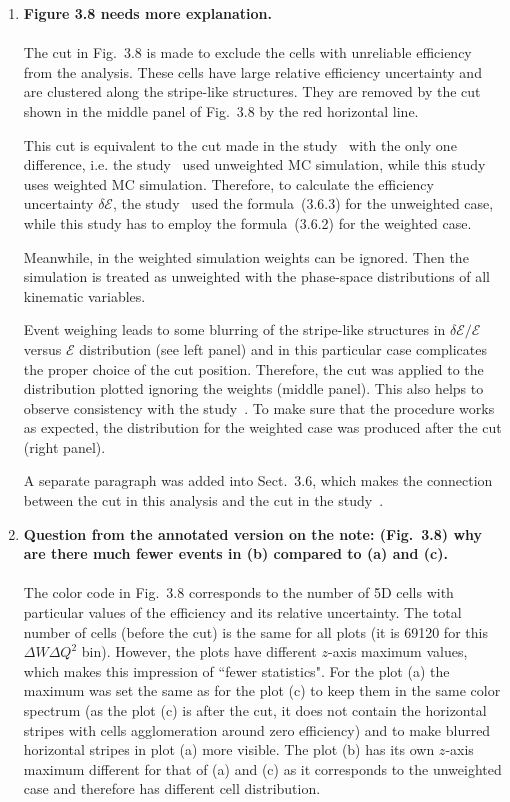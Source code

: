 \documentclass[,superscriptaddress,showpacs,amssymb,amsmath,amsfonts,linenumbers,article]{revtex4-1}
\begin{document}
\begin{enumerate}[label=\textbf{\arabic*}.]
\item {\bf Figure 3.8 needs more explanation.}\\ \\
The cut in Fig.~3.8 is made to exclude the cells with unreliable efficiency from the analysis. These cells have large relative efficiency uncertainty and are clustered along the stripe-like structures. They are removed by the cut shown in the middle panel of Fig.~3.8 by the red horizontal line.

This cut is equivalent to the cut made in the study~\cite{fedotov_prc} with the only one difference, i.e. the study~\cite{fedotov_prc} used unweighted MC simulation, while this study uses weighted MC simulation. Therefore, to calculate the efficiency uncertainty $\delta \mathcal{E}$, the study~\cite{fedotov_prc} used the formula~(3.6.3) for the unweighted case, while this study has to employ the formula~(3.6.2) for the weighted case. 

Meanwhile, in the weighted simulation weights can be ignored. Then the simulation is treated as unweighted with the phase-space distributions of all kinematic variables.


Event weighing leads to some blurring of the stripe-like structures in $\delta \mathcal{E} / \mathcal{E}$ versus $\mathcal{E}$ distribution (see left panel) and in this particular case complicates the proper choice of the cut position. Therefore, the cut was applied to the distribution plotted ignoring the weights (middle panel). This also helps to observe consistency with the study~\cite{fedotov_prc}. To make sure that the procedure works as expected, the distribution for the weighted case was produced after the cut (right panel).

A separate paragraph was added into Sect.~3.6, which makes the connection between the cut in this analysis and the cut in the study~\cite{fedotov_prc}.


\item {\bf Question from the annotated version on the note: (Fig.~3.8) why are there much fewer events in (b) compared to (a) and (c). }\\ \\
The color code in Fig.~3.8 corresponds to the number of 5D cells with particular values of the efficiency and its relative uncertainty. The total number of cells (before the cut) is the same for all plots (it is 69120 for this $\Delta W \Delta Q^{2}$ bin). However, the plots have different $z$-axis maximum values, which makes this impression of ``fewer statistics". For the plot (a) the maximum was set the same as for the plot (c) to keep them in the same color spectrum (as the plot (c) is after the cut, it does not contain the horizontal stripes with cells agglomeration around zero efficiency) and to make blurred horizontal stripes in plot (a) more visible.  The plot (b) has its own $z$-axis maximum different for that of (a) and (c) as it corresponds to the unweighted case and therefore has different cell distribution.


\end{enumerate}
\end{document}
